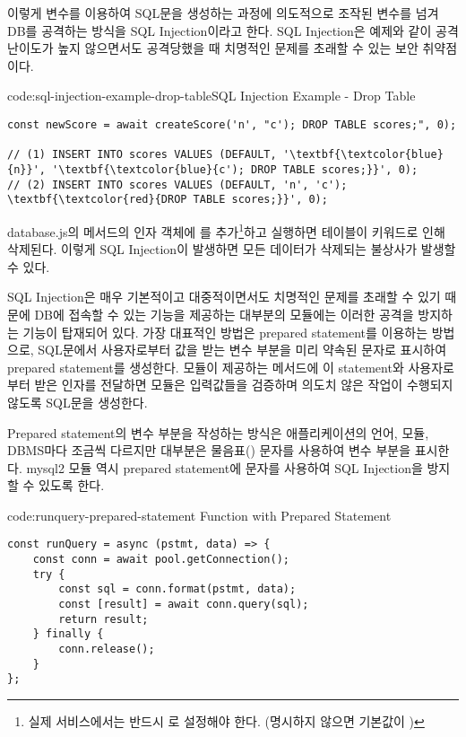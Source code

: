 이렇게 변수를 이용하여 SQL문을 생성하는 과정에 의도적으로 조작된 변수를 넘겨 DB를 공격하는 방식을 SQL Injection이라고 한다. SQL Injection은 예제와 같이 공격 난이도가 높지 않으면서도 공격당했을 때 치명적인 문제를 초래할 수 있는 보안 취약점이다.

\begin{codeenv}{code:sql-injection-example-drop-table}{SQL Injection Example - Drop Table}
\begin{Verbatim}[commandchars=\\\{\}]
const newScore = await createScore('n', "c'); DROP TABLE scores;", 0);

// (1) INSERT INTO scores VALUES (DEFAULT, '\textbf{\textcolor{blue}{n}}', '\textbf{\textcolor{blue}{c'); DROP TABLE scores;}}', 0);
// (2) INSERT INTO scores VALUES (DEFAULT, 'n', 'c'); \textbf{\textcolor{red}{DROP TABLE scores;}}', 0);
\end{Verbatim}
\end{codeenv}

database.js의  메서드의 인자 객체에 를 추가\footnote{실제 서비스에서는 반드시 로 설정해야 한다. (명시하지 않으면 기본값이 )}하고 \을 실행하면  테이블이  키워드로 인해 삭제된다. 이렇게 SQL Injection이 발생하면 모든 데이터가 삭제되는 불상사가 발생할 수 있다.

SQL Injection은 매우 기본적이고 대중적이면서도 치명적인 문제를 초래할 수 있기 때문에 DB에 접속할 수 있는 기능을 제공하는 대부분의 모듈에는 이러한 공격을 방지하는 기능이 탑재되어 있다. 가장 대표적인 방법은 prepared statement를 이용하는 방법으로, SQL문에서 사용자로부터 값을 받는 변수 부분을 미리 약속된 문자로 표시하여 prepared statement를 생성한다. 모듈이 제공하는 메서드에 이 statement와 사용자로부터 받은 인자를 전달하면 모듈은 입력값들을 검증하며 의도치 않은 작업이 수행되지 않도록 SQL문을 생성한다.

Prepared statement의 변수 부분을 작성하는 방식은 애플리케이션의 언어, 모듈, DBMS마다 조금씩 다르지만 대부분은 물음표() 문자를 사용하여 변수 부분을 표시한다. mysql2 모듈 역시 prepared statement에  문자를 사용하여 SQL Injection을 방지할 수 있도록 한다.

\begin{codeenv}{code:runquery-prepared-statement}{ Function with Prepared Statement}\begin{verbatim}
const runQuery = async (pstmt, data) => {
    const conn = await pool.getConnection();
    try {
        const sql = conn.format(pstmt, data);
        const [result] = await conn.query(sql);
        return result;
    } finally {
        conn.release();
    }
};
\end{verbatim}
\end{codeenv}

